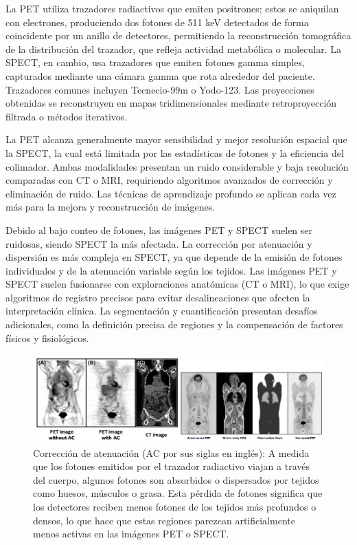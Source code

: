 La PET utiliza trazadores radiactivos que emiten positrones; estos se aniquilan con electrones, produciendo dos fotones de 511 keV detectados de forma coincidente por un anillo de detectores, permitiendo la reconstrucción tomográfica de la distribución del trazador, que refleja actividad metabólica o molecular. La SPECT, en cambio, usa trazadores que emiten fotones gamma simples, capturados mediante una cámara gamma que rota alrededor del paciente. Trazadores comunes incluyen Tecnecio-99m o Yodo-123. Las proyecciones obtenidas se reconstruyen en mapas tridimensionales mediante retroproyección filtrada o métodos iterativos.

La PET alcanza generalmente mayor sensibilidad y mejor resolución espacial que la SPECT, la cual está limitada por las estadísticas de fotones y la eficiencia del colimador. Ambas modalidades presentan un ruido considerable y baja resolución comparadas con CT o MRI, requiriendo algoritmos avanzados de corrección y eliminación de ruido. Las técnicas de aprendizaje profundo se aplican cada vez más para la mejora y reconstrucción de imágenes.

Debido al bajo conteo de fotones, las imágenes PET y SPECT suelen ser ruidosas, siendo SPECT la más afectada. La corrección por atenuación y dispersión es más compleja en SPECT, ya que depende de la emisión de fotones individuales y de la atenuación variable según los tejidos. Las imágenes PET y SPECT suelen fusionarse con exploraciones anatómicas (CT o MRI), lo que exige algoritmos de registro precisos para evitar desalineaciones que afecten la interpretación clínica. La segmentación y cuantificación presentan desafíos adicionales, como la definición precisa de regiones y la compensación de factores físicos y fisiológicos.

\begin{figure}[h]
\centering
\includegraphics[width = \textwidth]{figs/atenuation-correction.png}
\caption{Corrección de atenuación (AC por sus siglas en inglés): A medida que los fotones emitidos por el trazador radiactivo viajan a través del cuerpo, algunos fotones son absorbidos o dispersados por tejidos como huesos, músculos o grasa. Esta pérdida de fotones significa que los detectores reciben menos fotones de los tejidos más profundos o densos, lo que hace que estas regiones parezcan artificialmente menos activas en las imágenes PET o SPECT.}
\end{figure}

